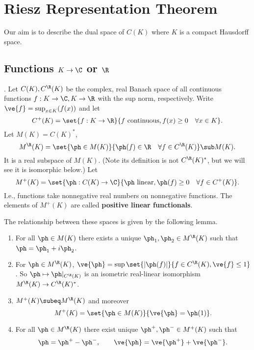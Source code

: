 \chapter{Riesz Representation Theorem}
Our aim is to describe the dual space of $C(K)$ where $K$ is a compact Hausdorff space.
\section{Functions $K\to \C$ or $\R$}
\begin{df}
.
Let $C(K),C^{\R}(K)$ be the complex, real Banach space of all continuous functions $f:K\to \C, K\to \R$ with the sup norm, respectively. Write $\ve{f}=\sup_{x\in K}(f(x))$ and let 
\[
C^+(K)=\set{f:K\to \R}{f\text{ continuous}, f(x)\ge 0\quad\forall x\in K}.
\]
Let $M(K)=C(K)^*$, \[M^{\R}(K)=\set{\ph\in M(K)}{\ph(f)\in \R\quad\forall f\in C^{\R}(K)}\sub M(K).\] It is a real subspace of $M(K)$. (Note its definition is not $C^{\R}(K)^*$, but we will see it is isomorphic below.)  Let
\[
M^+(K)=\set{\ph:C(K)\to \C}{\ph \text{ linear},\ph(f)\ge 0\quad\forall f\in C^+(K)}.
\]
I.e., functions take nonnegative real numbers on nonnegative functions. The elements of $M^+(K)$ are called \textbf{positive linear functionals}.
\end{df}
The relationship between these spaces is given by the following lemma.
\begin{lem}
\begin{enumerate}
\item
For all $\ph\in M(K)$ there exists a unique $\ph_1,\ph_2\in M^{\R}(K)$ such that $\ph=\ph_1+i\ph_2$.
\item
For $\ph\in M^{\R}(K)$, $\ve{\ph}=\sup\set{|\ph(f)|}{f\in C^{\R}(K),\ve{f}\le 1}$. So $\ph\mapsto \ph|_{C^{\R}(K)}$ is an isometric real-linear isomorphism $M^{\R}(K)\to C^{\R}(K)^*$.
\item $M^+(K)\subeq M^{\R}(K)$ and moreover 
\[M^+(K)=\set{\ph \in M(K)}{\ve{\ph}=\ph(1)}.\]
\item
For all $\ph\in M^{\R}(K)$ there exist unique $\ph^+,\ph^-\in M^+(K)$ such that 
\[
\ph=\ph^+-\ph^-,\qquad \ve{\ph}=\ve{\ph^+}+\ve{\ph^-}.
\]
\end{enumerate}
\end{lem}
